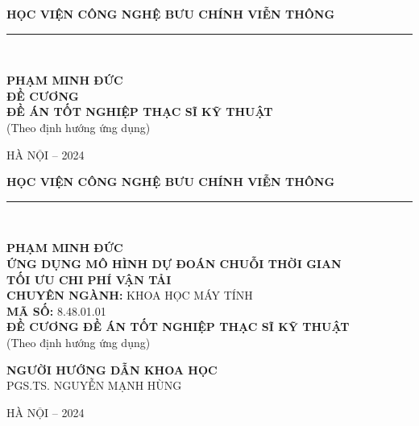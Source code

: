 \documentclass[main-report.tex]{subfiles}
\begin{document}
\begin{titlepage}
\centering
{\Large \textbf{HỌC VIỆN CÔNG NGHỆ BƯU CHÍNH VIỄN THÔNG}}\\[0.5cm]
\rule{\linewidth}{0.5pt}\\[1cm]


{\Large \textbf{PHẠM MINH ĐỨC}}\\[1cm]

{\LARGE \textbf{ĐỀ CƯƠNG}}\\[0.3cm]
{\LARGE \textbf{ĐỀ ÁN TỐT NGHIỆP THẠC SĨ KỸ THUẬT}}\\[0.3cm]
{\large (Theo định hướng ứng dụng)}\\[1cm]


{\Large HÀ NỘI – 2024}\\

\end{titlepage}

\begin{titlepage}
\centering
{\Large \textbf{HỌC VIỆN CÔNG NGHỆ BƯU CHÍNH VIỄN THÔNG}}\\[0.5cm]
\rule{\linewidth}{0.5pt}\\[1cm]


{\Large \textbf{PHẠM MINH ĐỨC}}\\[1cm]

{\LARGE \textbf{ỨNG DỤNG MÔ HÌNH DỰ ĐOÁN CHUỖI THỜI GIAN}}\\[0.3cm]
{\LARGE \textbf{TỐI ƯU CHI PHÍ VẬN TẢI}}\\[1cm]

{\large \textbf{CHUYÊN NGÀNH:} KHOA HỌC MÁY TÍNH}\\[0.3cm]
{\large \textbf{MÃ SỐ:} 8.48.01.01}\\[1cm]

{\Large \textbf{ĐỀ CƯƠNG ĐỀ ÁN TỐT NGHIỆP THẠC SĨ KỸ THUẬT}}\\[0.3cm]
{\large (Theo định hướng ứng dụng)}\\[1cm]


{\large \textbf{NGƯỜI HƯỚNG DẪN KHOA HỌC}}\\[0.2cm]
{\Large PGS.TS. NGUYỄN MẠNH HÙNG}\\[1cm]


{\Large HÀ NỘI – 2024}\\

\end{titlepage}
\end{document}
